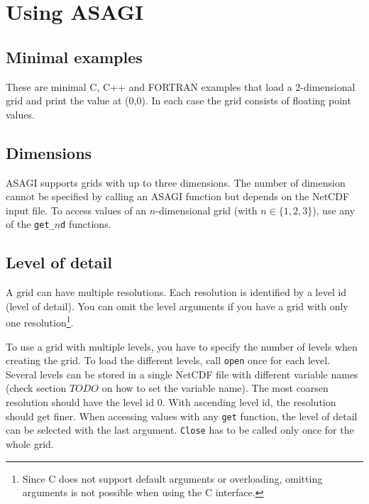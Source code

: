 \section{Using ASAGI}

\subsection{Minimal examples}

These are minimal C, C++ and FORTRAN examples that load a 2-dimensional grid and print the value at (0,0). In each case the grid consists of floating point values.







\subsection{Dimensions}

ASAGI supports grids with up to three dimensions. The number of dimension cannot be specified by calling an ASAGI function but depends on the NetCDF input file. To access values of an $n$-dimensional grid (with $n\in\{1,2,3\}$), use any of the \texttt{get\_$n$d} functions.

\subsection{Level of detail}

A grid can have multiple resolutions. Each resolution is identified by a level id (level of detail). You can omit the level arguments if you have a grid with only one resolution\footnote{Since C does not support default arguments or overloading, omitting arguments is not possible when using the C interface.}.

To use a grid with multiple levels, you have to specify the number of levels when creating the grid. To load the different levels, call \texttt{open} once for each level. Several levels can be stored in a single NetCDF file with different variable names (check section $TODO$ on how to set the variable name). The most coarsen resolution should have the level id 0. With ascending level id, the resolution should get finer. When accessing values with any \texttt{get} function, the level of detail can be selected with the last argument. \texttt{Close} has to be called only once for the whole grid.

